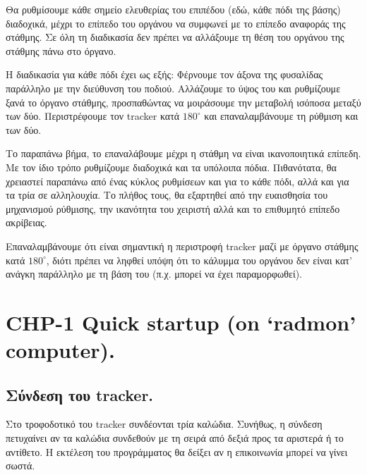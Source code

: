 \documentclass[
  a4paper,
  twoside,
  titlepage,
  12pt]{article}
\numberwithin{equation}{section}
\numberwithin{figure}{section}
\numberwithin{table}{section}
\begin{document}
Θα ρυθμίσουμε κάθε σημείο ελευθερίας του επιπέδου (εδώ, κάθε πόδι της βάσης) διαδοχικά, μέχρι το επίπεδο του οργάνου να συμφωνεί με το επίπεδο αναφοράς της στάθμης. Σε όλη τη διαδικασία δεν πρέπει να αλλάξουμε τη θέση του οργάνου της στάθμης πάνω στο όργανο.

Η διαδικασία για κάθε πόδι έχει ως εξής:
Φέρνουμε τον άξονα της φυσαλίδας παράλληλο με την διεύθυνση του ποδιού. Αλλάζουμε το ύψος του και ρυθμίζουμε ξανά το όργανο στάθμης, προσπαθώντας να μοιράσουμε την μεταβολή ισόποσα μεταξύ των δύο. Περιστρέφουμε τον tracker κατά \(180^\circ\) και επαναλαμβάνουμε τη ρύθμιση και των δύο.

Το παραπάνω βήμα, το επαναλάβουμε μέχρι η στάθμη να είναι ικανοποιητικά επίπεδη. Με τον ίδιο τρόπο ρυθμίζουμε διαδοχικά και τα υπόλοιπα πόδια. Πιθανότατα, θα χρειαστεί παραπάνω από ένας κύκλος ρυθμίσεων και για το κάθε πόδι, αλλά και για τα τρία σε αλληλουχία. Το πλήθος τους, θα εξαρτηθεί από την ευαισθησία του μηχανισμού ρύθμισης, την ικανότητα του χειριστή αλλά και το επιθυμητό επίπεδο ακρίβειας.

Επαναλαμβάνουμε ότι είναι σημαντική η περιστροφή tracker μαζί με όργανο στάθμης κατά \(180^\circ\), διότι πρέπει να ληφθεί υπόψη ότι το κάλυμμα του οργάνου δεν είναι κατ' ανάγκη παράλληλο με τη βάση του (π.χ. μπορεί να έχει παραμορφωθεί).

\newpage

\appendix

\hypertarget{chp-1-quick-startup-on-radmon-computer.}{%
\section{CHP-1 Quick startup (on `radmon' computer).}\label{chp-1-quick-startup-on-radmon-computer.}}

\hypertarget{ux3c3ux3cdux3bdux3b4ux3b5ux3c3ux3b7-ux3c4ux3bfux3c5-tracker.}{%
\subsection*{Σύνδεση του tracker.}\label{ux3c3ux3cdux3bdux3b4ux3b5ux3c3ux3b7-ux3c4ux3bfux3c5-tracker.}}

\vspace{-0.6\baselineskip}

Στο τροφοδοτικό του tracker συνδέονται τρία καλώδια.
Συνήθως, η σύνδεση πετυχαίνει αν τα καλώδια συνδεθούν με τη σειρά από δεξιά προς τα αριστερά ή το αντίθετο.
Η εκτέλεση του προγράμματος θα δείξει αν η επικοινωνία μπορεί να γίνει σωστά.
\end{document}
